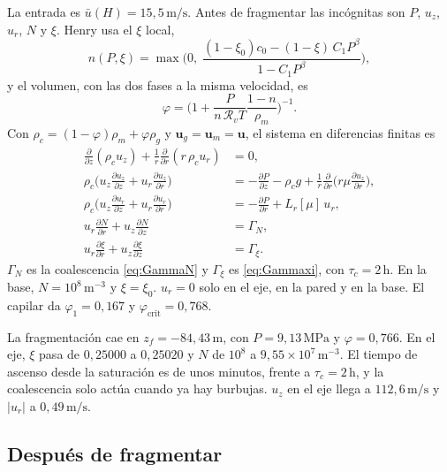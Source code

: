 \documentclass[11pt,a4paper]{article}
\newcommand{\p}{\partial}
\newcommand{\Rv}{\mathcal{R}_v}
\begin{document}
La entrada es \(\bar u(H)=15{,}5\,\mathrm{m/s}\). Antes de
fragmentar las incógnitas son \(P\), \(u_z\), \(u_r\), \(N\) y
\(\xi\). Henry usa el \(\xi\) local,
\begin{equation}
\label{eq:n-pre}
n(P,\xi)
=\max\Biggl(0,\;
\frac{(1-\xi_0)c_0-(1-\xi)\,C_1 P^{\beta}}{1-C_1 P^{\beta}}\Biggr),
\end{equation}
y el volumen, con las dos fases a la misma velocidad, es
\begin{equation}
\label{eq:phi-pre}
\varphi
=\Biggl(1+\frac{P}{n\,\Rv T}\frac{1-n}{\rho_m}\Biggr)^{-1}.
\end{equation}
Con \(\rho_c=(1-\varphi)\rho_m+\varphi\rho_g\) y
\(\mathbf{u}_g=\mathbf{u}_m=\mathbf{u}\), el sistema en diferencias
finitas es
\begin{align}
\label{eq:fd-pre}
\frac{\p}{\p z}(\rho_c u_z)
+\frac{1}{r}\frac{\p}{\p r}(r\,\rho_c u_r)
&=0,
\\
\rho_c\Biggl(u_z\frac{\p u_z}{\p z}+u_r\frac{\p u_z}{\p r}\Biggr)
&=
-\frac{\p P}{\p z}-\rho_c g
+\frac{1}{r}\frac{\p}{\p r}\Biggl(r\mu\frac{\p u_z}{\p r}\Biggr),
\\
\rho_c\Biggl(u_z\frac{\p u_r}{\p z}+u_r\frac{\p u_r}{\p r}\Biggr)
&=
-\frac{\p P}{\p r}
+L_r[\mu]\,u_r,
\\
u_r\frac{\p N}{\p r}+u_z\frac{\p N}{\p z}
&=\Gamma_N,
\\
u_r\frac{\p \xi}{\p r}+u_z\frac{\p \xi}{\p z}
&=\Gamma_\xi.
\end{align}
\(\Gamma_N\) es la coalescencia \eqref{eq:GammaN} y \(\Gamma_\xi\) es
\eqref{eq:Gammaxi}, con \(\tau_c=2\,\mathrm{h}\). En la base,
\(N=10^{8}\,\mathrm{m^{-3}}\) y \(\xi=\xi_0\). \(u_r=0\) solo en el
eje, en la pared y en la base. El capilar da
\(\varphi_1=0{,}167\) y \(\varphi_{\mathrm{crit}}=0{,}768\).

La fragmentación cae en \(z_f=-84{,}43\,\mathrm{m}\), con
\(P=9{,}13\,\mathrm{MPa}\) y \(\varphi=0{,}766\). En el eje,
\(\xi\) pasa de \(0{,}25000\) a \(0{,}25020\) y \(N\) de
\(10^{8}\) a \(9{,}55\times 10^{7}\,\mathrm{m^{-3}}\). El tiempo de
ascenso desde la saturación es de unos minutos, frente a
\(\tau_c=2\,\mathrm{h}\), y la coalescencia solo actúa cuando ya hay
burbujas. \(u_z\) en el eje llega a \(112{,}6\,\mathrm{m/s}\) y
\(|u_r|\) a \(0{,}49\,\mathrm{m/s}\).

\subsection{Después de fragmentar}
\end{document}
